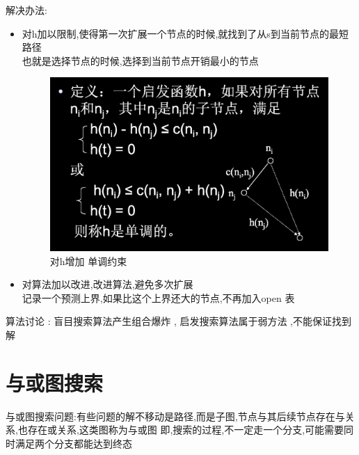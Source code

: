 \documentclass[UTF8,a4paper]{ctexart}
\begin{document}
解决办法:
\begin{itemize}
	\item 对h加以限制,使得第一次扩展一个节点的时候,就找到了从s到当前节点的最短路径\\
	      也就是选择节点的时候,选择到当前节点开销最小的节点
	      \begin{figure}[H]
		      \centering
		      \includegraphics[scale = 0.3]{assets/ArtificialIntelligence_61699.png}
		      \caption{对h增加 单调约束}
	      \end{figure}
	\item 对算法加以改进,改进算法,避免多次扩展\\
	      记录一个预测上界,如果比这个上界还大的节点,不再加入open 表
\end{itemize}

算法讨论 : 盲目搜索算法产生组合爆炸 , 启发搜索算法属于弱方法 ,不能保证找到解

\section{与或图搜索}

与或图搜索问题:有些问题的解不移动是路径,而是子图,节点与其后续节点存在与关系,也存在或关系,这类图称为与或图
即,搜索的过程,不一定走一个分支,可能需要同时满足两个分支都能达到终态
\end{document}

